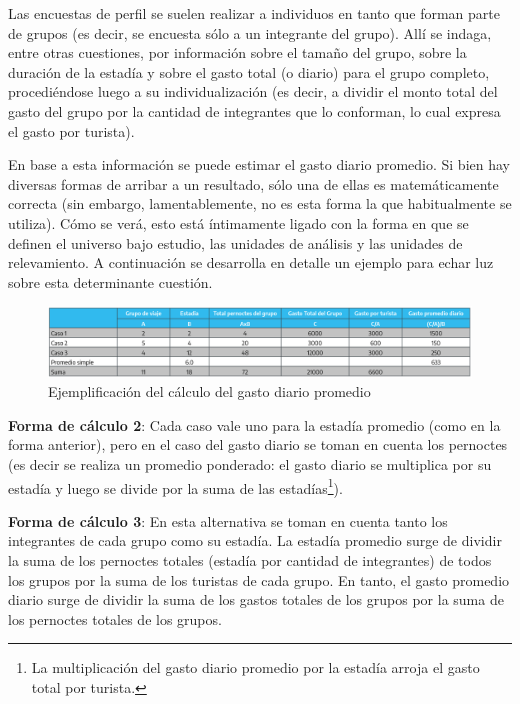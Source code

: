 \documentclass[
]{book}
\begin{document}
Las encuestas de perfil se suelen realizar a individuos en tanto que forman parte de grupos (es decir, se encuesta sólo a un integrante del grupo). Allí se indaga, entre otras cuestiones, por información sobre el tamaño del grupo, sobre la duración de la estadía y sobre el gasto total (o diario) para el grupo completo, procediéndose luego a su individualización (es decir, a dividir el monto total del gasto del grupo por la cantidad de integrantes que lo conforman, lo cual expresa el gasto por turista).

En base a esta información se puede estimar el gasto diario promedio. Si bien hay diversas formas de arribar a un resultado, sólo una de ellas es matemáticamente correcta (sin embargo, lamentablemente, no es esta forma la que habitualmente se utiliza). Cómo se verá, esto está íntimamente ligado con la forma en que se definen el universo bajo estudio, las unidades de análisis y las unidades de relevamiento. A continuación se desarrolla en detalle un ejemplo para echar luz sobre esta determinante cuestión.

\begin{figure}

{\centering \includegraphics[width=1\linewidth]{imagenes/tabla_6} 

}

\caption{Ejemplificación del cálculo del gasto diario promedio}\label{fig:Casos}
\end{figure}

\textbf{Forma de cálculo 2}: Cada caso vale uno para la estadía promedio (como en la forma anterior), pero en el caso del gasto diario se toman en cuenta los pernoctes (es decir se realiza un promedio ponderado: el gasto diario se multiplica por su estadía y luego se divide por la suma de las estadías\footnote{La multiplicación del gasto diario promedio por la estadía arroja el gasto total por turista.}).

\textbf{Forma de cálculo 3}: En esta alternativa se toman en cuenta tanto los integrantes de cada grupo como su estadía. La estadía promedio surge de dividir la suma de los pernoctes totales (estadía por cantidad de integrantes) de todos los grupos por la suma de los turistas de cada grupo. En tanto, el gasto promedio diario surge de dividir la suma de los gastos totales de los grupos por la suma de los pernoctes totales de los grupos.
\end{document}
